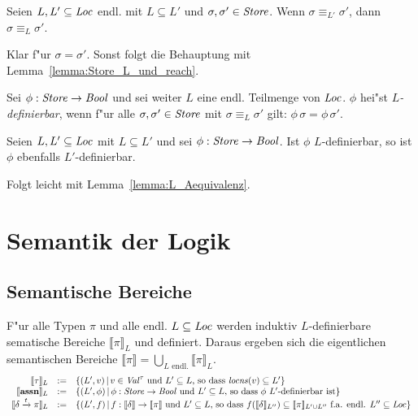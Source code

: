 \documentclass[12pt,a4paper,bigheadings]{scrartcl}
\newcommand{\semantic}[1]{\ensuremath{\llbracket#1\rrbracket}}
\newcommand{\assn}{\ensuremath{\mathbf{assn}}}
\newcommand{\locns}{\name{locns}}
\newcommand{\tto}{\ensuremath{\xrightarrow{t}}}
\begin{document}
\begin{lemma} \label{lemma:L_Aequivalenz}
  Seien $L,L'\subseteq{\text{\it Loc\/}}$ endl. mit $L \subseteq L'$ und $\sigma,\sigma'\in{\text{\it Store\/}}$. Wenn $\sigma \equiv_{L'} \sigma'$,
  dann $\sigma \equiv_L \sigma'$.
\end{lemma}

\begin{beweis}
  Klar f"ur $\sigma = \sigma'$. Sonst folgt die Behauptung mit Lemma~\ref{lemma:Store_L_und_reach}.
\end{beweis}

\begin{definition}[$L$-Definierbarkeit]
  Sei $\phi : {\text{\it Store\/}} \to {\text{\it Bool\/}}$ und sei weiter $L$ eine endl. Teilmenge von ${\text{\it Loc\/}}$.
  $\phi$ hei"st {\em $L$-definierbar}, wenn f"ur alle $\sigma,\sigma'\in{\text{\it Store\/}}$ mit
  $\sigma \equiv_L \sigma'$ gilt: $\phi\,\sigma = \phi\,\sigma'$.
\end{definition}

\begin{lemma} \label{lemma:L_Definierbarkeit}
  Seien $L,L'\subseteq{\text{\it Loc\/}}$ mit $L \subseteq L'$ und sei $\phi:{\text{\it Store\/}} \to {\text{\it Bool\/}}$. Ist $\phi$ $L$-definierbar,
  so ist $\phi$ ebenfalls $L'$-definierbar.
\end{lemma}

\begin{beweis}
  Folgt leicht mit Lemma~\ref{lemma:L_Aequivalenz}.
\end{beweis}


\section{Semantik der Logik}

\subsection{Semantische Bereiche}

F"ur alle Typen $\pi$ und alle endl. $L \subseteq {\text{\it Loc\/}}$ werden induktiv $L$-definierbare
sematische Bereiche $\semantic{\pi}_L$ und definiert. Daraus ergeben sich die eigentlichen
semantischen Bereiche $\semantic{\pi} = \bigcup\limits_{L \text{ endl.}} \semantic{\pi}_L$.
\[\begin{array}{rcl}
  \semantic{\tau}_L &:=& \{(L',v)\,|\,v \in \Val^\tau \text{ und $L' \subseteq L$, so dass } \locns(v) \subseteq L'\} \\
  \semantic{\assn}_L &:=& \{(L',\phi)\,|\,\phi:\Store\to\Bool\text{ und $L'\subseteq L$, so dass $\phi$ $L'$-definierbar ist}\} \\
  \semantic{\delta\tto\pi}_L &:=& \{(L',f)\,|\,f:\semantic{\delta}\to\semantic{\pi} \text{ und $L' \subseteq L$, so dass }
                                    f(\semantic{\delta}_{L''}) \subseteq \semantic{\pi}_{L'\cup L''}
                                    \text{ f.a. endl. $L''\subseteq\Loc$}\} 
\end{array}\]
\end{document}
